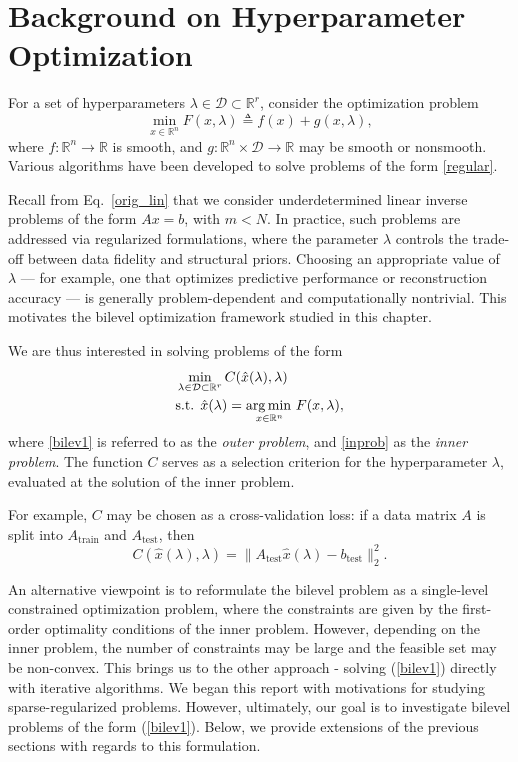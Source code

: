 \documentclass[11pt, twoside]{report}
\begin{document}
\chapter{Background on Hyperparameter Optimization}
For a set of hyperparameters $\lambda \in \mathcal{D} \subset \mathbb{R}^r$, 
consider the optimization problem
\begin{equation} \label{regular}
    \min_{x \in \mathbb{R}^n} F(x,\lambda) \triangleq f(x) + g(x,\lambda),
\end{equation}
where $f : \mathbb{R}^n \to \mathbb{R}$ is smooth, and 
$g : \mathbb{R}^n \times \mathcal{D} \to \mathbb{R}$ may be smooth or nonsmooth. 
Various algorithms have been developed to solve problems of the form 
\eqref{regular}.

Recall from Eq.~\eqref{orig_lin} that we consider underdetermined linear 
inverse problems of the form $Ax=b$, with $m<N$. In practice, such problems 
are addressed via regularized formulations, where the parameter $\lambda$ 
controls the trade-off between data fidelity and structural priors. 
Choosing an appropriate value of $\lambda$ — for example, one that 
optimizes predictive performance or reconstruction accuracy — is 
generally problem-dependent and computationally nontrivial. 
This motivates the bilevel optimization framework studied in this chapter.


We are thus interested in solving problems of the form
\begin{align} 
&\min_{\lambda \in \mathcal{D} \subset \mathbb{R}^r} 
C(\hat{x}(\lambda), \lambda) \label{bilev1}\\
&\text{s.t. } 
\hat{x}(\lambda) = \operatorname*{arg\, min \,}_{x \in \mathbb{R}^{n}} F(x, \lambda), 
\label{inprob}
\end{align}
where \eqref{bilev1} is referred to as the \emph{outer problem}, and 
\eqref{inprob} as the \emph{inner problem}. 
The function $C$ serves as a selection criterion for the hyperparameter 
$\lambda$, evaluated at the solution of the inner problem.

For example, $C$ may be chosen as a cross-validation loss: if a data matrix 
$A$ is split into $A_{\mathrm{train}}$ and $A_{\mathrm{test}}$, then
\[
C(\hat{x}(\lambda), \lambda)
= \|A_{\mathrm{test}} \hat{x}(\lambda) - b_{\mathrm{test}}\|_2^2.
\]


An alternative viewpoint is to reformulate the bilevel problem as a single-level constrained optimization problem, where the constraints are given by the first-order optimality conditions of the inner problem. However, depending on the inner problem, the number of constraints may be large and the feasible set may be non-convex. %
This brings us to the other approach - solving (\ref{bilev1}) directly with iterative algorithms. We began this report with motivations for studying sparse-regularized problems. However, ultimately, our goal is to investigate bilevel problems of the form (\ref{bilev1}). Below, we provide extensions of the previous sections with regards to this formulation.
\end{document}
